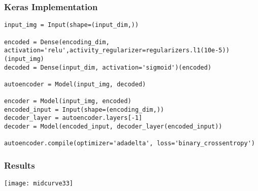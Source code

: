\begin{frame}[fragile]\frametitle{Keras Implementation}

\begin{lstlisting}
input_img = Input(shape=(input_dim,))
    
encoded = Dense(encoding_dim, activation='relu',activity_regularizer=regularizers.l1(10e-5))(input_img)
decoded = Dense(input_dim, activation='sigmoid')(encoded) 
    
autoencoder = Model(input_img, decoded)
            
encoder = Model(input_img, encoded)
encoded_input = Input(shape=(encoding_dim,))
decoder_layer = autoencoder.layers[-1]
decoder = Model(encoded_input, decoder_layer(encoded_input))
    
autoencoder.compile(optimizer='adadelta', loss='binary_crossentropy')
\end{lstlisting}	
\end{frame}

\begin{frame}[fragile]\frametitle{Results}

\begin{center}
\texttt{[image: midcurve33]}
\end{center}	
\end{frame}



